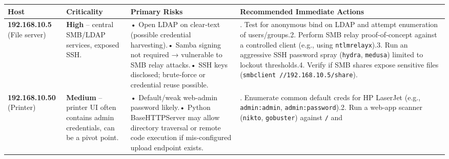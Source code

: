 \begin{longtable}[]{@{}
        >{\raggedright\arraybackslash}p{}
        >{\raggedright\arraybackslash}p{}
        >{\raggedright\arraybackslash}p{}
        >{\raggedright\arraybackslash}p{}@{}}
    \toprule\noalign{}
    \begin{minipage}[b]{\linewidth}
                \raggedright
            Host
    \end{minipage} & \begin{minipage}[b]{\linewidth}
                                 \raggedright
                             Criticality
    \end{minipage} & \begin{minipage}[b]{\linewidth}
                                 \raggedright
                             Primary Risks
    \end{minipage} & \begin{minipage}[b]{\linewidth}
                                 \raggedright
                             Recommended Immediate Actions
    \end{minipage} \\
    \midrule\noalign{}
    \endhead
    \bottomrule\noalign{}
    \endlastfoot
    \textbf{192.168.10.5} (File server) & \textbf{High} -- central SMB/LDAP
    services, exposed SSH. & • Open LDAP on clear‑text (possible credential
    harvesting).• Samba signing not required → vulnerable to SMB relay
    attacks.• SSH keys disclosed; brute‑force or credential reuse possible.
    & 1. Test for anonymous bind on LDAP and attempt enumeration of
    users/groups.2. Perform SMB relay proof‑of‑concept against a controlled
    client (e.g., using \texttt{ntlmrelayx}).3. Run an aggressive SSH
    password spray (\texttt{hydra}, \texttt{medusa}) limited to lockout
    thresholds.4. Verify if SMB shares expose sensitive files
    (\texttt{smbclient\ //192.168.10.5/share}). \\
    \textbf{192.168.10.50} (Printer) & \textbf{Medium} -- printer UI often
    contains admin credentials, can be a pivot point. & • Default/weak
    web‑admin password likely.• Python BaseHTTPServer may allow directory
    traversal or remote code execution if mis‑configured upload endpoint
    exists. & 1. Enumerate common default creds for HP LaserJet (e.g.,
    \texttt{admin:admin}, \texttt{admin:password}).2. Run a web‑app scanner
    (\texttt{nikto}, \texttt{gobuster}) against \texttt{/} and

\end{longtable}
